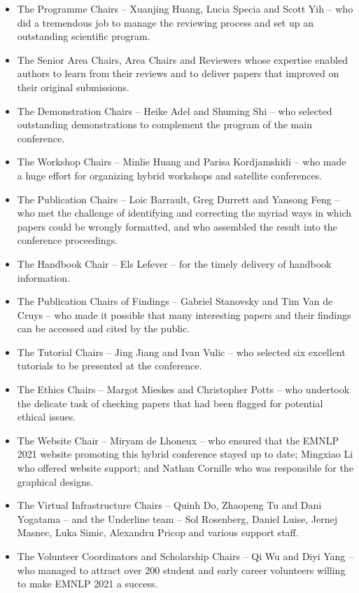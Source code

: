 \begin{itemize}

\item The Programme Chairs -- Xuanjing Huang, Lucia Specia and Scott Yih -- who did a tremendous job to manage the reviewing process and set up an outstanding scientific program.
\item The Senior Area Chairs, Area Chairs and Reviewers whose expertise enabled authors to learn from their reviews and to deliver papers that improved on their original submissions.
\item The Demonstration Chairs -- Heike Adel and Shuming Shi -- who selected outstanding demonstrations to complement the program of the main conference.
\item The Workshop Chairs -- Minlie Huang and Parisa Kordjamshidi -- who made a huge effort for organizing hybrid workshops and satellite conferences.
\item The Publication Chairs -- Loic Barrault, Greg Durrett and Yansong Feng -- who met the challenge of identifying and correcting the myriad ways in which papers could be wrongly formatted, and who assembled the result into the conference proceedings.
\item The Handbook Chair -- Els Lefever -- for the timely delivery of handbook information.
\item The Publication Chairs of Findings -- Gabriel Stanovsky and Tim Van de Cruys -- who made it possible that many interesting papers and their findings can be accessed and cited by the public.
\item The Tutorial Chairs -- Jing Jiang and Ivan Vulic -- who selected six excellent tutorials to be presented at the conference.
\item The Ethics Chairs -- Margot Mieskes and Christopher Potts -- who undertook the delicate task of checking papers that had been flagged for potential ethical issues.
\item The Website Chair -- Miryam de Lhoneux -- who ensured that the EMNLP 2021 website promoting this hybrid conference stayed up to date; Mingxiao Li who offered website support; and Nathan Cornille who was responsible for the graphical designs.
\item The Virtual Infrastructure Chairs -- Quinh Do, Zhaopeng Tu and Dani Yogatama -- and the Underline team -- Sol Rosenberg, Daniel Luise, Jernej Masnec, Luka Simic, Alexandru Pricop and various support staff.
\item The Volunteer Coordinators and Scholarship Chairs -- Qi Wu and Diyi Yang -- who managed to attract over 200 student and early career volunteers willing to make EMNLP 2021 a success.

\end{itemize}
